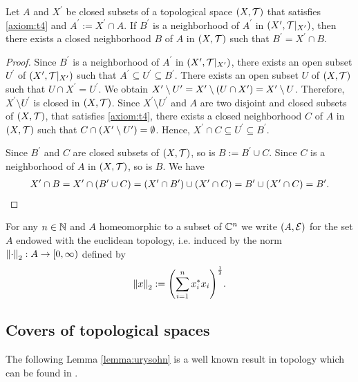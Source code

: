 \begin{lemma}
	Let $A$ and $X^\prime$ be closed subsets of a topological space $\tspace$ that satisfies \ref{axiom:t4} and $A^\prime := X^\prime \cap A$. If $B^\prime$ is a neighborhood of $A^\prime$ in $\reltspace[X^\prime]$, then there exists a closed neighborhood $B$ of $A$ in $\tspace$ such that $B^\prime = X^\prime \cap B$. 
\end{lemma}
\begin{proof}
	Since $B^\prime$ is a neighborhood of $A^\prime$ in $\reltspace[X^\prime]$, there exists an open subset $U^\prime$ of $\reltspace[X^\prime]$ such that $A^\prime \subseteq U^\prime \subseteq B^\prime$. There exists an open subset $U$ of $\tspace$ such that $U \cap X^\prime = U^\prime$. We obtain $X^\prime \setminus U^\prime = X^\prime \setminus \pbraces{U \cap X^\prime} = X^\prime \setminus U$. Therefore, $X^\prime \setminus U^\prime$ is closed in $\tspace$. Since $X^\prime \setminus U^\prime$ and $A$ are two disjoint and closed subsets of $\tspace$, that satisfies \ref{axiom:t4}, there exists a closed neighborhood $C$ of $A$ in $\tspace$ such that $C \cap \pbraces{X^\prime \setminus U^\prime} = \emptyset$. Hence, $X^\prime \cap C \subseteq U^\prime \subseteq B^\prime$. 
	
	Since $B^\prime$ and $C$ are closed subsets of $\tspace$, so is $B := B^\prime \cup C$. Since $C$ is a neighborhood of $A$ in $\tspace$, so is $B$. We have
	\begin{align*}
		X^\prime \cap B = X^\prime \cap \pbraces{B^\prime \cup C} = (X^\prime \cap B^\prime) \cup \pbraces{X^\prime \cap C} = B^\prime \cup \pbraces{X^\prime \cap C} = B^\prime.
	\end{align*}
\end{proof}

For any $n \in \N$ and $A$ homeomorphic to a subset of $\C^n$ we write $\eucl[A]$ for the set $A$ endowed with the euclidean topology, i.e. induced by the norm $\norm[2]{\cdot}: A \to [0, \infty)$ defined by
\begin{align*}
	\norm[2]{x} := \pbraces{\sum_{i = 1}^n x_i^\ast x_i}^{\frac{1}{2}}.
\end{align*}


\subsection{Covers of topological spaces}

The following Lemma \ref{lemma:urysohn} is a well known result in topology which can be found in \cite[p. 445]{Ana1&2}.

